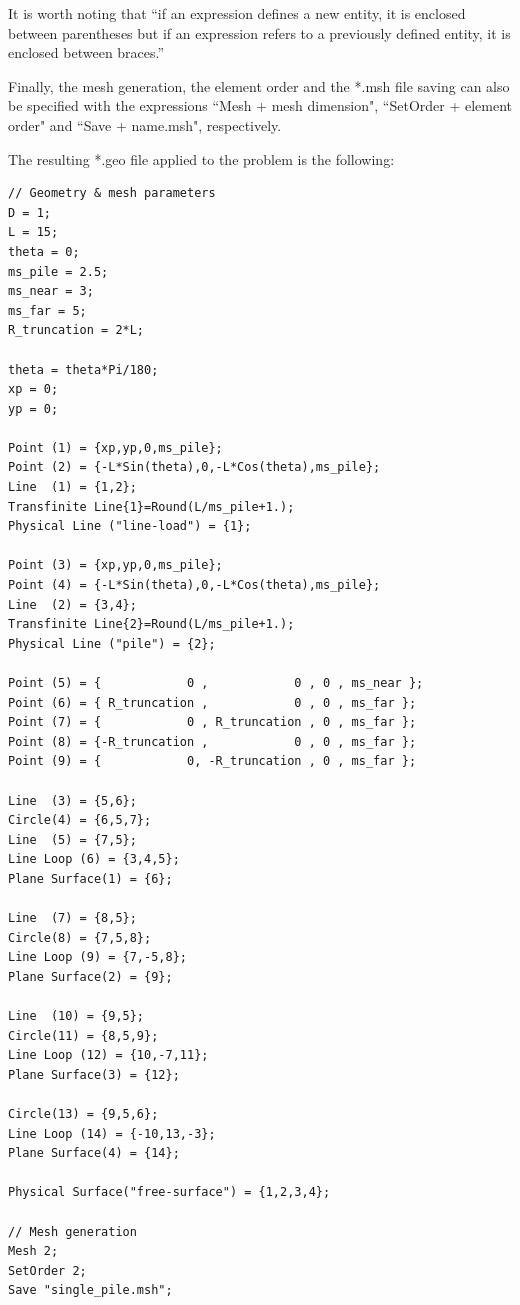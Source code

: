\documentclass[a4]{article}
\begin{document}
It is worth noting that “if an expression defines a new entity, it is enclosed between parentheses but if an expression refers to a previously defined entity, it is enclosed between braces.” \cite{gmshweb}

Finally, the mesh generation, the element order and the *.msh file saving can also be specified with the expressions ``Mesh + mesh dimension", ``SetOrder + element order" and ``Save + name.msh", respectively.

The resulting *.geo file applied to the problem is the following:

\begin{Verbatim}
// Geometry & mesh parameters
D = 1;
L = 15;
theta = 0;
ms_pile = 2.5;
ms_near = 3;
ms_far = 5;
R_truncation = 2*L;

theta = theta*Pi/180; 
xp = 0;           
yp = 0;

Point (1) = {xp,yp,0,ms_pile};
Point (2) = {-L*Sin(theta),0,-L*Cos(theta),ms_pile};
Line  (1) = {1,2};
Transfinite Line{1}=Round(L/ms_pile+1.);
Physical Line ("line-load") = {1};

Point (3) = {xp,yp,0,ms_pile};
Point (4) = {-L*Sin(theta),0,-L*Cos(theta),ms_pile};
Line  (2) = {3,4};
Transfinite Line{2}=Round(L/ms_pile+1.);
Physical Line ("pile") = {2};

Point (5) = {            0 ,            0 , 0 , ms_near };
Point (6) = { R_truncation ,            0 , 0 , ms_far };
Point (7) = {            0 , R_truncation , 0 , ms_far };
Point (8) = {-R_truncation ,            0 , 0 , ms_far };
Point (9) = {            0, -R_truncation , 0 , ms_far };

Line  (3) = {5,6};
Circle(4) = {6,5,7};
Line  (5) = {7,5};
Line Loop (6) = {3,4,5}; 
Plane Surface(1) = {6};

Line  (7) = {8,5};
Circle(8) = {7,5,8};
Line Loop (9) = {7,-5,8}; 
Plane Surface(2) = {9};

Line  (10) = {9,5};
Circle(11) = {8,5,9};
Line Loop (12) = {10,-7,11}; 
Plane Surface(3) = {12};

Circle(13) = {9,5,6};
Line Loop (14) = {-10,13,-3}; 
Plane Surface(4) = {14};

Physical Surface("free-surface") = {1,2,3,4};

// Mesh generation
Mesh 2;
SetOrder 2;
Save "single_pile.msh";
\end{Verbatim}
\end{document}
